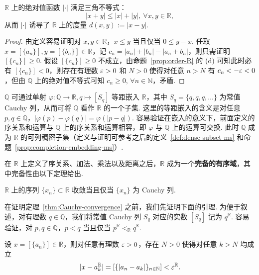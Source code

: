 \documentclass[../main.tex]{subfiles}
\begin{document}
\begin{proposition}
    $\mathbb R$ 上的绝对值函数 $|\cdot|$ 满足三角不等式：
    $$
    |x + y| \leqslant |x| + |y|,\ \forall x, y \in \mathbb R, 
    $$
    从而 $|\cdot|$ 诱导了 $\mathbb R$ 上的度量 $d(x, y) := |x - y|$. 
\end{proposition}

\begin{proof}
    由定义容易证明对 $x, y \in \mathbb R$，$x \leqslant y$ 当且仅当 $0 \leqslant y - x$. 任取 $x = [\{a_n\}], y = [\{b_n\}] \in \mathbb R$，记 $c_n = |a_n| + |b_n| - |a_n + b_n|$，则只需证明 $[\{c_n\}] \geqslant 0$. 假设 $[\{c_n\}] \geqslant 0$ 不成立，由命题~\ref{prop:order-R} 的 (d) 可知此时必有 $[\{c_n\}] < 0$，则存在有理数 $\varepsilon > 0$ 和 $N > 0$ 使得对任意 $n > N$ 有 $c_n < -\varepsilon < 0$，但由 $\mathbb Q$ 上的绝对值不等式可知 $c_n \geqslant 0,\,\forall n \in \mathbb N$，矛盾. 
\end{proof}

\begin{remark}
    $\mathbb Q$ 可通过单射 $\varphi:\mathbb Q \to \mathbb R, q \mapsto [S_q]$ 等距嵌入 $\mathbb R$，其中 $S_q = \{q, q, q, \dots\}$ 为常值 Cauchy 列，从而可将 $\mathbb Q$ 看作 $\mathbb R$ 的一个子集. 这里的等距嵌入的含义是对任意 $p, q \in \mathbb Q$，$|\varphi(p) - \varphi(q)| = \varphi(|p - q|)$. 容易验证在嵌入的意义下，前面定义的序关系和运算与 $\mathbb Q$ 上的序关系和运算相容，即 $\varphi$ 与 $\mathbb Q$ 上的运算可交换. 此时 $\mathbb Q$ 成为 $\mathbb R$ 的可列稠密子集（定义与证明可参考之后的定义~\ref{def:dense-subset-ms} 和命题~\ref{prop:completion-embedding-ms}）. 
\end{remark}

在 $\mathbb R$ 上定义了序关系、加法、乘法以及距离之后，$\mathbb R$ 成为一个\textbf{完备的有序域}，其中完备性由以下定理给出. 

\begin{theorem} \label{thm:Cauchy-convergence} 
    $\mathbb R$ 上的序列 $\{x_n\} \subset \mathbb R$ 收敛当且仅当 $\{x_n\}$ 为 Cauchy 列. 
\end{theorem}

在证明定理~\ref{thm:Cauchy-convergence} 之前，我们先证明下面的引理. 为便于叙述，对有理数 $q \in \mathbb Q$，我们将常值 Cauchy 列 $S_q$ 对应的实数 $[S_q]$ 记为 $q^\mathbb R$. 容易验证，对 $p, q \in \mathbb Q$，$p < q$ 当且仅当 $p^\mathbb R <_\mathbb R q^\mathbb R$. 

\begin{lemma} \label{lem:dist-Cauchy-seq-Q}
    设 $x = [\{a_n\}] \in \mathbb R$，则对任意有理数 $\varepsilon > 0$，存在 $N > 0$ 使得对任意 $k > N$ 均成立 
    $$
    |x - a_k^\mathbb R| = [\{|a_n - a_k|\}_{n \in \mathbb N}] < \varepsilon^{\mathbb R}. 
    $$
\end{lemma}
\end{document}

